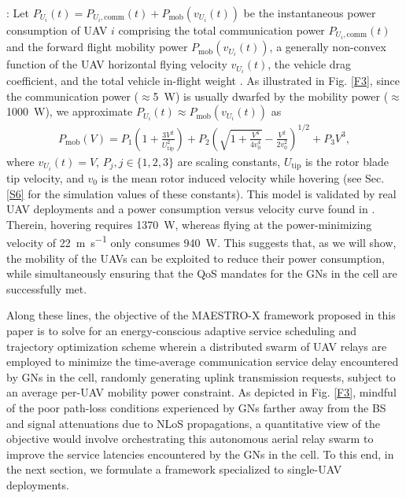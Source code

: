 \documentclass[12pt, draftcls, onecolumn]{IEEEtran}
\theoremstyle{plain}
\theoremstyle{definition}
\theoremstyle{remark}
\begin{document}
: Let $P_{U_{i}}(t){=}P_{U_{i}, \mathrm{comm}}(t){+}P_{\mathrm{mob}}(v_{U_{i}}(t))$ be the instantaneous power consumption of UAV $i$ comprising the total communication power $P_{U_{i}, \mathrm{comm}}(t)$ and the forward flight mobility power $P_{\mathrm{mob}}(v_{U_{i}}(t))$, a generally non-convex function of the UAV horizontal flying velocity $v_{U_{i}}(t)$, the vehicle drag coefficient, and the total vehicle in-flight weight \cite{EnduranceEstimation}. As illustrated in Fig. \ref{F3}, since the communication power ($\approx$\qty[mode=text]{5}{\watt}) is usually dwarfed by the mobility power ($\approx$\qty[mode=text]{1000}{\watt}), we approximate $P_{U_{i}}(t){\approx}P_{\mathrm{mob}}(v_{U_{i}}(t))$ as \cite{SCA}
\begin{align}\label{eq:Power}
    P_{\mathrm{mob}}(V)=P_{1}\left(1+\frac{3V^{2}}{U_{\mathrm{tip}}^{2}}\right)+P_{2}\left(\sqrt{1+\frac{V^{4}}{4v_{0}^{4}}}-\frac{V^{2}}{2v_{0}^{2}}\right)^{1/2}+P_{3}V^{3},
\end{align}
where $v_{U_{i}}(t){=}V$, $P_{j},j{\in}\{1,2,3\}$ are scaling constants, $U_{\mathrm{tip}}$ is the rotor blade tip velocity, and $v_{0}$ is the mean rotor induced velocity while hovering (see Sec. \ref{S6} for the simulation values of these constants). This model is validated by real UAV deployments \cite{EnduranceEstimation} and a power consumption versus velocity curve found in \cite{SCA}. Therein, hovering requires \qty[mode=text]{1370}{\watt}, whereas flying at the power-minimizing velocity of \qty[mode=text]{22}{\meter\per\second} only consumes \qty[mode=text]{940}{\watt}. This suggests that, as we will show, the mobility of the UAVs can be exploited to reduce their power consumption, while simultaneously ensuring that the QoS mandates for the GNs in the cell are successfully met.

Along these lines, the objective of the MAESTRO-X framework proposed in this paper is to solve for an energy-conscious adaptive service scheduling and trajectory optimization scheme wherein a distributed swarm of UAV relays are employed to minimize the time-average communication service delay encountered by GNs in the cell, randomly generating uplink transmission requests, subject to an average per-UAV mobility power constraint. As depicted in Fig. \ref{F3}, mindful of the poor path-loss conditions experienced by GNs farther away from the BS and signal attenuations due to NLoS propagations, a quantitative view of the objective would involve orchestrating this autonomous aerial relay swarm to improve the service latencies encountered by the GNs in the cell. To this end, in the next section, we formulate a framework specialized to single-UAV deployments.
\vspace{-4mm}
\end{document}
